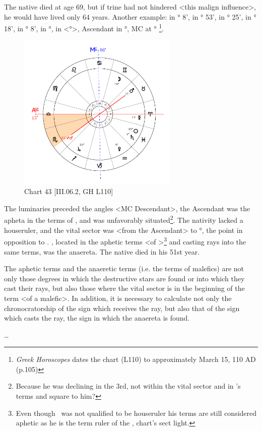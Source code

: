 The native died at age 69, but if \Jupiter\xspace trine had not hindered <this malign influence>, he would have lived only 64 years.
\newpage
Another example: \Sun\xspace in \Pisces\xspace 25° 8', \Moon\xspace in \Gemini\xspace 16° 53', \Saturn\xspace in \Pisces\xspace 1° 25', \Jupiter\xspace in
\Sagittarius\xspace 24° 18', \Mars\xspace in \Taurus\xspace 21° 8', \Venus\xspace in \Aquarius\xspace 9°, \Mercury\xspace in <°>, Ascendant in \Libra\xspace 15°, MC at \Cancer\xspace 16°
\footnote{\textit{Greek Horoscopes} dates the chart (L110) to approximately March 15, 110 AD (p.105)}.  

\clearpage
\begin{figure}
\centering
\vspace{-20pt}
\includegraphics[width=0.68\textwidth]{charts/3_06_2}
\caption{Chart 43 [III.06.2, GH L110]}
\label{fig:chart43}
\end{figure} 

The luminaries preceded the angles <MC Descendant>, the Ascendant was the apheta in the terms of \Jupiter, and \Jupiter\xspace was unfavorably situated\footnote{Because he was declining in the 3rd, not within the vital sector and in \Saturn's terms and square to him?}. The nativity lacked a houseruler, and the vital sector was <from the Ascendant> to \Scorpio\xspace 21°, the point in opposition to \Mars. \Mars, located in the aphetic terms <of \Jupiter>\footnote{Even though \Jupiter\, was not qualified to be houseruler his terms are still considered aphetic as he is the term ruler of the \Moon, chart's sect light.} and casting rays into the same terms, was the anaereta. The
native died in his 51st year.

\enlargethispage{2\baselineskip}
The aphetic terms and the anaeretic terms (i.e. the terms of malefics) are not only those degrees in which the destructive stars are found or into which they cast their rays, but also those where the vital sector is in the beginning of the term <of a malefic>. In addition, it is necessary to calculate not only the chronocratorship of the sign which receives the ray, but also that of the sign which casts the ray, the sign in which the anaereta is found.

\ldots

\newpage